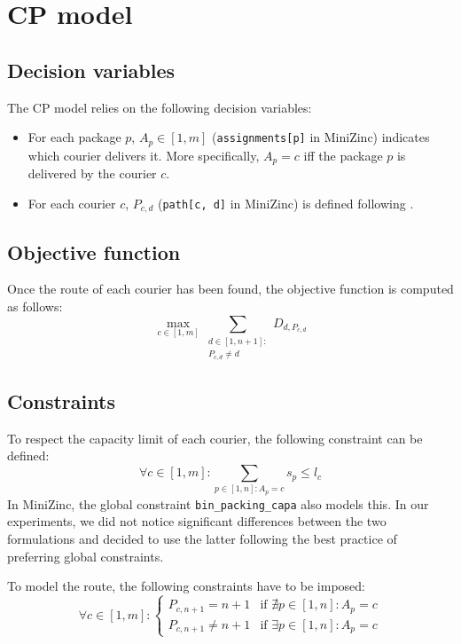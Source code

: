 \section{CP model}


\subsection{Decision variables}

The CP model relies on the following decision variables:
\begin{itemize}
    \item For each package $p$, $A_p \in [1, m]$ (\texttt{assignments[p]} in MiniZinc) indicates which courier delivers it. More specifically, $A_p = c$ iff the package $p$ is delivered by the courier $c$.
    
    \item For each courier $c$, $P_{c, d}$ (\texttt{path[c, d]} in MiniZinc) is defined following .
\end{itemize}



\subsection{Objective function}
Once the route of each courier has been found, the objective function is computed as follows:
\begin{equation}
    \max_{c \in [1, m]} \sum_{\substack{d \in [1, n+1]:\\P_{c, d} \neq d}} D_{d, P_{c, d}}
\end{equation}


\subsection{Constraints}

To respect the capacity limit of each courier, the following constraint can be defined:
\begin{equation}
    \forall c \in [1, m]: \sum_{p \in [1, n]: A_p = c} s_p \leq l_c 
\end{equation}
In MiniZinc, the global constraint \texttt{bin\_packing\_capa} also models this. In our experiments, we did not notice significant differences between the two formulations and decided to use the latter following the best practice of preferring global constraints.

To model the route, the following constraints have to be imposed:
\begin{equation}
    \label{eq:cp_constr_route_depot}
    \forall c \in [1, m]: 
    \begin{cases}
        P_{c, n+1} = n+1    & \text{if $\nexists p \in [1, n]: A_p = c$} \\ 
        P_{c, n+1} \neq n+1 & \text{if $\exists p \in [1, n]: A_p = c$} 
    \end{cases}
\end{equation}

